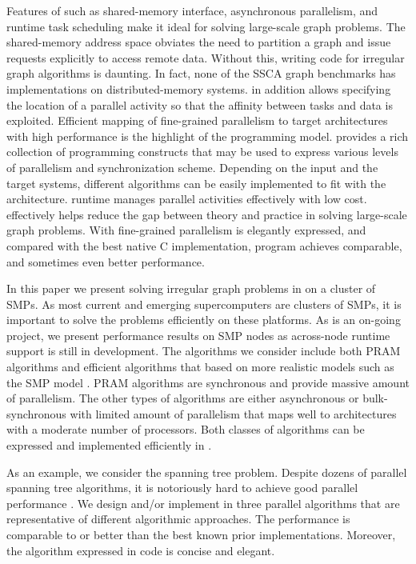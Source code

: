 Features of \Xten{} such as shared-memory interface, asynchronous parallelism, and runtime task scheduling make it ideal for solving large-scale graph problems. The shared-memory address space obviates the need to partition a graph and issue requests explicitly to access remote data. Without this, writing code for  irregular graph algorithms is daunting. In fact, none of the SSCA \cite{KK05} graph benchmarks has implementations on distributed-memory systems. \Xten{} in addition allows specifying the location of a parallel activity so that the affinity between tasks and data is exploited. 
Efficient mapping of fine-grained parallelism to target architectures with high performance is the highlight of the \Xten{} programming model. \Xten{} provides a rich collection of programming constructs that may be used to express various levels of parallelism and synchronization scheme. Depending on the input and the target systems, different algorithms can be easily implemented to fit with the architecture. \Xten{} runtime manages parallel activities effectively with low cost.
\Xten{} effectively helps reduce the gap between theory and practice in solving large-scale graph problems. With \Xten{} fine-grained parallelism is elegantly expressed, and compared with the best native C implementation, \Xten{} program achieves comparable, and sometimes even better performance. 


 In this paper we present solving irregular graph problems in \Xten{} on a cluster of SMPs. As most current and emerging supercomputers are clusters of SMPs, it is important to solve the problems efficiently on these platforms. As \Xten{} is an on-going project, we present performance results on SMP nodes as across-node runtime support is still in development. The algorithms we consider include both PRAM algorithms and efficient algorithms that based on more realistic models such as the SMP model \cite{HJ01}. PRAM algorithms are synchronous and provide massive amount of parallelism. The other types of algorithms are either asynchronous or bulk-synchronous with limited amount of parallelism that maps well to architectures with a moderate number of processors. Both classes of algorithms can be expressed and implemented efficiently in \Xten{}.

As an example, we consider the spanning tree problem. Despite dozens of parallel spanning tree algorithms, it is notoriously hard to achieve good parallel performance \cite{BC04a}. We design and/or implement in \Xten{} three parallel algorithms that are representative of different algorithmic approaches. The performance is comparable to or better than the best known prior implementations. Moreover, the algorithm expressed in \Xten{} code is concise and elegant.

